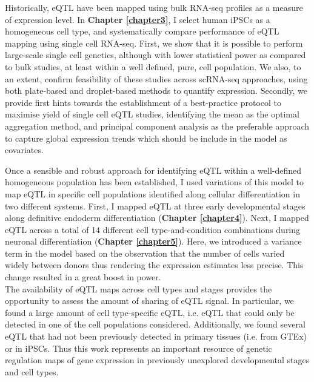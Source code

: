 Historically, eQTL have been mapped using bulk RNA-seq profiles as a measure of expression level.
In \textbf{Chapter 
\ref{chapter3}}, I select human iPSCs as a homogeneous cell type, and systematically compare performance of eQTL mapping using single cell RNA-seq. 
First, we show that it is possible to perform large-scale single cell genetics, although with lower statistical power as compared to bulk studies, at least within a well defined, pure, cell population. 
We also, to an extent, confirm feasibility of these studies across scRNA-seq approaches, using both plate-based and droplet-based methods to quantify expression.
Secondly, we provide first hints towards the establishment of a best-practice protocol to maximise yield of single cell eQTL studies, identifying the mean as the optimal aggregation method, and principal component analysis as the preferable approach to capture global expression trends which should be include in the model as covariates. 

Once a sensible and robust approach for identifying eQTL within a well-defined homogeneous population has been established, I used variations of this model to map eQTL in specific cell populations identified along cellular differentiation in two different systems.
First, I mapped eQTL at three early developmental stages along definitive endoderm differentiation (\textbf{Chapter 
\ref{chapter4}}).
Next, I mapped eQTL across a total of 14 different cell type-and-condition combinations during neuronal differentiation (\textbf{Chapter 
\ref{chapter5}}). 
Here, we introduced a variance term in the model based on the observation that the number of cells varied widely between donors thus rendering the expression estimates less precise. 
This change resulted in a great boost in power.
\\

The availability of eQTL maps across cell types and stages provides the opportunity to assess the amount of sharing of eQTL signal.
In particular, we found a large amount of cell type-specific eQTL, i.e. eQTL that could only be detected in one of the cell populations considered.
Additionally, we found several eQTL that had not been previously detected in primary tissues (i.e. from GTEx) or in iPSCs.
Thus this work represents an important resource of genetic regulation maps of gene expression in previously unexplored developmental stages and cell types. \\

